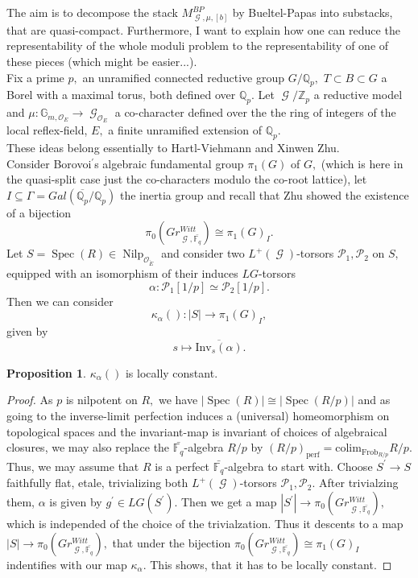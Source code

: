 \documentclass[a4paper,11,5 pt]{amsart}
\theoremstyle{definition}
\newtheorem{proposition}[Satz]{Proposition}
\DeclareMathOperator{\Spec}{Spec}
\DeclareMathOperator{\Nilp}{Nilp}
\DeclareMathOperator{\G}{\mathcal{G}}
\begin{document}
The aim is to decompose the stack $M_{\G,\mu,[b]}^{BP}$ by Bueltel-Papas into substacks, that are quasi-compact. Furthermore, I want to explain how one can reduce the representability of the whole moduli problem to the representability of one of these pieces (which might be easier...).
\\
Fix a prime $p,$ an unramified connected reductive group $G/\mathbb{Q}_{p},$ $T\subset B \subset G$ a Borel with a maximal torus, both defined over $\mathbb{Q}_{p}.$ Let $\G/\mathbb{Z}_{p}$ a reductive model and $\mu\colon \mathbb{G}_{m,\mathcal{O}_{E}}\rightarrow \G_{\mathcal{O}_{E}}$ a co-character defined over the the ring of integers of the local reflex-field, $E,$ a finite unramified extension of $\mathbb{Q}_{p}.$
\\
These ideas belong essentially to Hartl-Viehmann and Xinwen Zhu.
\\
Consider Borovoi$^{\prime}$s algebraic fundamental group $\pi_{1}(G)$ of $G,$ (which is here in the quasi-split case just the co-characters modulo the co-root lattice), let $I\subseteq \Gamma=Gal(\overline{\mathbb{Q}_{p}}/\mathbb{Q}_{p})$ the inertia group and recall that Zhu showed the existence of a bijection
$$
\pi_{0}(Gr_{\G,\bar{\mathbb{F}_{q}}}^{Witt})\cong\pi_{1}(G)_{I}.
$$
Let $S=\Spec(R)\in \Nilp_{\mathcal{O}_{\breve{E}}}$ and consider two $L^{+}(\G)$-torsors $\mathcal{P}_{1},\mathcal{P}_{2}$ on $S,$ equipped with an isomorphism of their induces $LG$-torsors
$$
\alpha\colon \mathcal{P}_{1}[1/p]\simeq \mathcal{P}_{2}[1/p].
$$
Then we can consider
$$
\kappa_{\alpha}()\colon |S|\rightarrow \pi_{1}(G)_{I},
$$
given by
$$
s\mapsto \overline{\text{Inv}_{s}(\alpha)}.
$$
\begin{proposition}
$\kappa_{\alpha}()$ is locally constant.
\end{proposition}
\begin{proof}
As $p$ is nilpotent on $R,$ we have $|\Spec(R)|\cong |\Spec(R/p)|$ and as going to the inverse-limit perfection induces a (universal) homeomorphism on topological spaces and the invariant-map is invariant of choices of algebraical closures, we may also replace the $\bar{\mathbb{F}_{q}}$-algebra $R/p$ by $(R/p)_{\text{perf}}=\text{colim}_{\text{Frob}_{R/p}} R/p.$
\\
Thus, we may assume that $R$ is a perfect $\bar{\mathbb{F}_{q}}$-algebra to start with. Choose $S^{\prime}\rightarrow S$ faithfully flat, etale, trivializing both $L^{+}(\G)$-torsors $\mathcal{P}_{1},\mathcal{P}_{2}.$ After trivialzing them, $\alpha$ is given by $g^{\prime}\in LG(S^{\prime}).$ Then we get a map $|S^{\prime}|\rightarrow \pi_{0}(Gr_{\G,\bar{\mathbb{F}_{q}}}^{Witt}),$ which is independed of the choice of the trivialzation. Thus it descents to a map
$|S|\rightarrow \pi_{0}(Gr_{\G,\bar{\mathbb{F}_{q}}}^{Witt}),$ that under the bijection $\pi_{0}(Gr_{\G,\bar{\mathbb{F}_{q}}}^{Witt})\cong\pi_{1}(G)_{I}$ indentifies with our map $\kappa_{\alpha}.$ This shows, that it has to be locally constant.
\end{proof}
\end{document}
